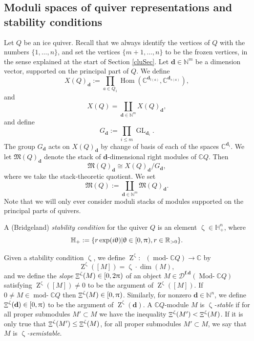 \documentclass[a4paper,10pt]{amsart}
\newcommand{\dd}{\mathbf{d}}
\DeclareMathOperator{\Z}{Z}
\DeclareMathOperator{\DIM}{dim}
\newcommand{\Mst}{\mathfrak{M}}
\renewcommand{\theta}{\uptheta}
\renewcommand{\zeta}{\upzeta}
\renewcommand{\pi}{\uppi\hspace{0.05em}}
\DeclareMathOperator{\KK}{K_0}
\DeclareMathOperator{\Hom}{Hom}
\DeclareMathOperator{\Mu}{\Upxi}
\DeclareMathOperator{\fd}{\mathbf{f.d}}
\DeclareMathOperator{\tmod}{mod-}
\DeclareMathOperator{\Tmod}{Mod-}
\newcommand{\rmod}[1]{\tmod\!#1}
\newcommand{\Rmod}[1]{\Tmod\!#1}
\DeclareMathOperator{\Gl}{GL}
\newcommand{\Dub}{\mathcal{D}}
\begin{document}
\subsection{Moduli spaces of quiver representations and stability conditions}
Let $Q$ be an ice quiver.  Recall that we always identify the vertices of $Q$ with the numbers $\{1,\ldots,n\}$, and set the vertices $\{m+1,\ldots,n\}$ to be the frozen vertices, in the sense explained at the start of Section \ref{cluSec}.  Let $\dd\in\mathbb{N}^{m}$ be a dimension vector, supported on the principal part of $Q$.  We define
\[
X(Q)_\dd:=\prod_{a\in Q_1}\Hom(\mathbb{C}^{\dd_{t(a)}},\mathbb{C}^{\dd_{s(a)}}),
\]
and 
\[
X(Q)=\coprod_{\dd\in\mathbb{N}^{m}}X(Q)_{\dd}, 
\]
and define 
\[
G_\dd:=\prod_{i\leq m}\Gl_{\dd_i}.  
\]
The group $G_\dd$ acts on $X(Q)_\dd$ by change of basis of each of the spaces $\mathbb{C}^{\dd_i}$.  We let $\Mst(Q)_\dd$ denote the stack of $\dd$-dimensional right modules of $\mathbb{C}Q$.  Then
\[
\Mst(Q)_\dd\cong X(Q)_\dd/G_\dd,
\]
where we take the stack-theoretic quotient.  We set
\[
\Mst(Q):=\coprod_{\dd\in\mathbb{N}^{m}}\Mst(Q)_\dd.
\]
Note that we will only ever consider moduli stacks of modules supported on the principal parts of quivers.

A (Bridgeland) \textit{stability condition} for the quiver $Q$ is an element $\zeta\in\mathbb{H}_+^{n}$, where 
\[
\mathbb{H}_+:=\{r\exp(i\theta)|\theta\in[0,\pi),r\in \mathbb{R}_{>0}\}.  
\]

Given a stability condition $\zeta$, we define $\Z^{\zeta}\colon\KK(\rmod{\mathbb{C}Q})\rightarrow \mathbb{C}$ by 
\[
\Z^{\zeta}([M])=\zeta\cdot\DIM(M),
\]
and we define the \textit{slope} $\Mu^{\zeta}(M)\in [0, 2\pi)$ of an object $M\in\Dub^{\fd}(\Rmod{\mathbb{C}Q})$ satisfying $\Z^{\zeta}([M])\neq 0$ to be the argument of $\Z^{\zeta}([M])$.  If $0\neq M\in\rmod{\mathbb{C}Q}$ then $\Mu^{\zeta}(M)\in [0,\pi)$.  Similarly, for nonzero $\dd\in\mathbb{N}^n$, we define $\Mu^{\zeta}(\dd)\in [0,\pi)$ to be the argument of $\Z^{\zeta}(\dd)$.  A $\mathbb{C}Q$-module $M$ is $\zeta$\textit{-stable} if for all proper submodules $M'\subset M$ we have the inequality $\Mu^{\zeta}(M')<\Mu^{\zeta}(M)$.  If it is only true that $\Mu^{\zeta}(M')\leq \Mu^{\zeta}(M)$, for all proper submodules $M'\subset M$, we say that $M$ is $\zeta$\textit{-semistable}.
\end{document}
